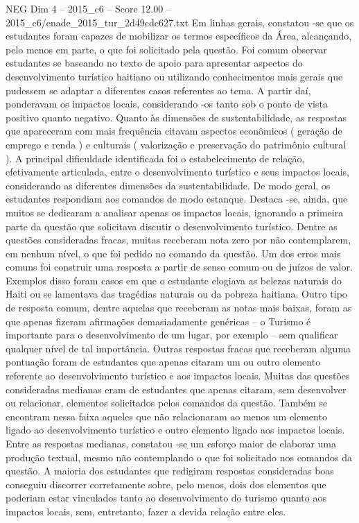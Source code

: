 \begin{textsample}{NEG Dim 4 – 2015\_c6 – Score 12.00 – 2015\_c6/enade\_2015\_tur\_2d49cdc627.txt}
Em linhas gerais, constatou -se que os estudantes foram capazes de mobilizar os termos específicos da Área, alcançando, pelo menos em parte, o que foi solicitado pela questão.
Foi comum observar estudantes se baseando no texto de apoio para apresentar aspectos do desenvolvimento turístico haitiano ou utilizando conhecimentos mais gerais que pudessem se adaptar a diferentes casos referentes ao tema.
A partir daí, ponderavam os impactos locais, considerando -os tanto sob o ponto de vista positivo quanto negativo.
Quanto às dimensões de sustentabilidade, as respostas que apareceram com mais frequência citavam aspectos econômicos ( geração de emprego e renda ) e culturais ( valorização e preservação do patrimônio cultural ).
A principal dificuldade identificada foi o estabelecimento de relação, efetivamente articulada, entre o desenvolvimento turístico e seus impactos locais, considerando as diferentes dimensões da sustentabilidade.
De modo geral, os estudantes respondiam aos comandos de modo estanque.
Destaca -se, ainda, que muitos se dedicaram a analisar apenas os impactos locais, ignorando a primeira parte da questão que solicitava discutir o desenvolvimento turístico.
Dentre as questões consideradas fracas, muitas receberam nota zero por não contemplarem, em nenhum nível, o que foi pedido no comando da questão.
Um dos erros mais comuns foi construir uma resposta a partir de senso comum ou de juízos de valor.
Exemplos disso foram casos em que o estudante elogiava as belezas naturais do Haiti ou se lamentava das tragédias naturais ou da pobreza haitiana.
Outro tipo de resposta comum, dentre aquelas que receberam as notas mais baixas, foram as que apenas fizeram afirmações demasiadamente genéricas – o Turismo é importante para o desenvolvimento de um lugar, por exemplo – sem qualificar qualquer nível de tal importância.
Outras respostas fracas que receberam alguma pontuação foram de estudantes que apenas citaram um ou outro elemento referente ao desenvolvimento turístico e aos impactos locais.
Muitas das questões consideradas medianas eram de estudantes que apenas citaram, sem desenvolver ou relacionar, elementos solicitados pelos comandos da questão.
Também se encontram nessa faixa aqueles que não relacionaram ao menos um elemento ligado ao desenvolvimento turístico e outro elemento ligado aos impactos locais.
Entre as respostas medianas, constatou -se um esforço maior de elaborar uma produção textual, mesmo não contemplando o que foi solicitado nos comandos da questão.
A maioria dos estudantes que redigiram respostas consideradas boas conseguiu discorrer corretamente sobre, pelo menos, dois dos elementos que poderiam estar vinculados tanto ao desenvolvimento do turismo quanto aos impactos locais, sem, entretanto, fazer a devida relação entre eles.

\end{textsample}
